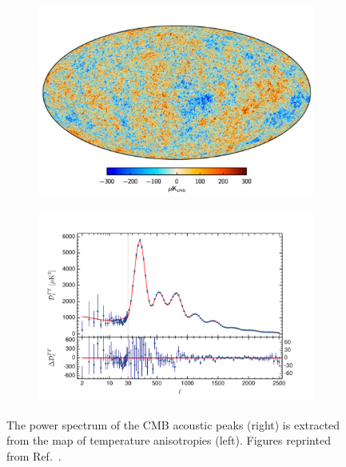 \begin{figure}[!ht]
     \centering
     \begin{subfigure}{0.47\textwidth}
         \centering
         \includegraphics[width=\textwidth]{figures/DMOverview/CMBImg.png}
         \caption{}
         \label{fig:DMOverview/CMBImg}
     \end{subfigure}
     \hfill
     \begin{subfigure}{0.47\textwidth}
         \centering
         \includegraphics[width=\textwidth]{figures/DMOverview/CMBPS.png}
         \caption{}
         \label{fig:DMOverview/CMBPowerSpec}
     \end{subfigure}
     \caption{The power spectrum of the CMB acoustic peaks (right) is extracted from the map of temperature anisotropies (left). Figures reprinted from Ref.~\cite{Cirelli:2024ssz}.}
     \label{fig:DMOverview/CMB}
\end{figure}

